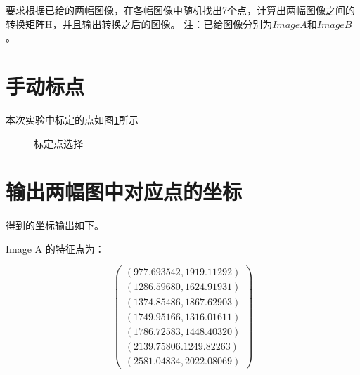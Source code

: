 \documentclass[UTF8]{ctexart}
\begin{document}
要求根据已给的两幅图像，在各幅图像中随机找出7个点，计算出两幅图像之间的转换矩阵H，并且输出转换之后的图像。
注：已给图像分别为$Image A$和$Image B$。

\section{手动标点}

本次实验中标定的点如图\ref{interest_point_selection}所示

\begin{figure}[h!]
	\centering
	\hspace{0.1in} 	
	\caption{标定点选择} 
	\label{interest_point_selection} %
\end{figure}

\section{输出两幅图中对应点的坐标}

得到的坐标输出如下。

Image A 的特征点为：
	   
\[\left( \begin{array}{cc}
	\left(977.693542 , 1919.11292\right) \\
	\left(1286.59680 , 1624.91931\right) \\
	\left(1374.85486 , 1867.62903\right) \\
	\left(1749.95166 , 1316.01611\right) \\
	\left(1786.72583 , 1448.40320\right) \\
	\left(2139.75806 . 1249.82263\right) \\
	\left(2581.04834 , 2022.08069\right) 
\end{array} \right)\]
\end{document}

